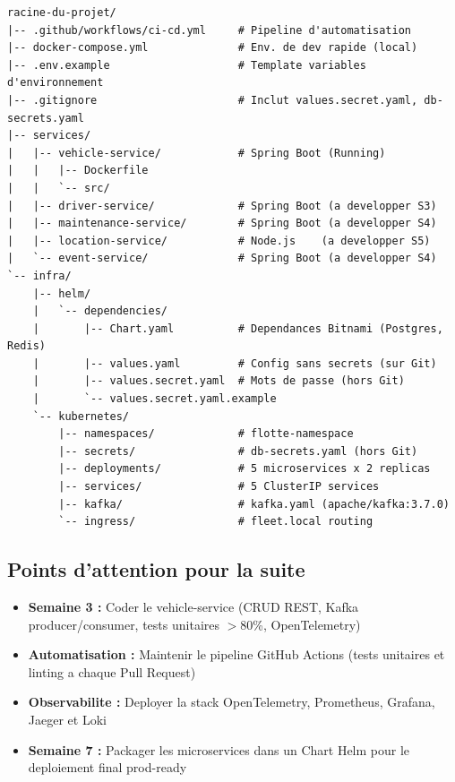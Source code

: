 \documentclass[12pt,a4paper]{article}
\begin{document}
\begin{lstlisting}[caption=Arborescence du projet en fin de semaine 2]
racine-du-projet/
|-- .github/workflows/ci-cd.yml     # Pipeline d'automatisation
|-- docker-compose.yml              # Env. de dev rapide (local)
|-- .env.example                    # Template variables d'environnement
|-- .gitignore                      # Inclut values.secret.yaml, db-secrets.yaml
|-- services/
|   |-- vehicle-service/            # Spring Boot (Running)
|   |   |-- Dockerfile
|   |   `-- src/
|   |-- driver-service/             # Spring Boot (a developper S3)
|   |-- maintenance-service/        # Spring Boot (a developper S4)
|   |-- location-service/           # Node.js    (a developper S5)
|   `-- event-service/              # Spring Boot (a developper S4)
`-- infra/
    |-- helm/
    |   `-- dependencies/
    |       |-- Chart.yaml          # Dependances Bitnami (Postgres, Redis)
    |       |-- values.yaml         # Config sans secrets (sur Git)
    |       |-- values.secret.yaml  # Mots de passe (hors Git)
    |       `-- values.secret.yaml.example
    `-- kubernetes/
        |-- namespaces/             # flotte-namespace
        |-- secrets/                # db-secrets.yaml (hors Git)
        |-- deployments/            # 5 microservices x 2 replicas
        |-- services/               # 5 ClusterIP services
        |-- kafka/                  # kafka.yaml (apache/kafka:3.7.0)
        `-- ingress/                # fleet.local routing
\end{lstlisting}

\subsection{Points d'attention pour la suite}

\begin{itemize}
  \item \textbf{Semaine 3 :} Coder le vehicle-service (CRUD REST, Kafka producer/consumer,
        tests unitaires $>$80\%, OpenTelemetry)
  \item \textbf{Automatisation :} Maintenir le pipeline GitHub Actions (tests unitaires
        et linting a chaque Pull Request)
  \item \textbf{Observabilite :} Deployer la stack OpenTelemetry, Prometheus, Grafana,
        Jaeger et Loki
  \item \textbf{Semaine 7 :} Packager les microservices dans un Chart Helm pour le
        deploiement final prod-ready
\end{itemize}
\end{document}
